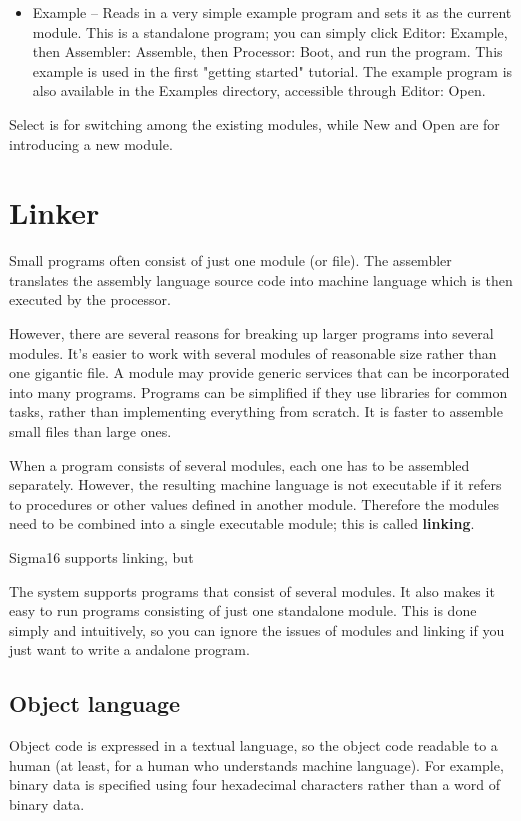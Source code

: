 \documentclass[11pt]{article}
\begin{document}
\begin{itemize}
\item Example -- Reads in a very simple example program and sets it as the
current module.  This is a standalone program; you can simply click
Editor: Example, then Assembler: Assemble, then Processor: Boot, and
run the program.  This example is used in the first "getting
started" tutorial.  The example program is also available in the
Examples directory, accessible through Editor: Open.
\end{itemize}

Select is for switching among the existing modules, while New and Open
are for introducing a new module.

\section*{Linker}
\label{sec:org6200deb}
Small programs often consist of just one module (or file).  The
assembler translates the assembly language source code into machine
language which is then executed by the processor.

However, there are several reasons for breaking up larger programs
into several modules.  It's easier to work with several modules of
reasonable size rather than one gigantic file.  A module may provide
generic services that can be incorporated into many programs.
Programs can be simplified if they use libraries for common tasks,
rather than implementing everything from scratch.  It is faster to
assemble small files than large ones.

When a program consists of several modules, each one has to be
assembled separately.  However, the resulting machine language is not
executable if it refers to procedures or other values defined in
another module.  Therefore the modules need to be combined into a
single executable module; this is called \textbf{linking}.

Sigma16 supports linking, but

The system supports programs that consist of several modules.  It also
makes it easy to run programs consisting of just one standalone
module.  This is done simply and intuitively, so you can ignore the
issues of modules and linking if you just want to write a andalone
program.

\subsection*{Object language}
\label{sec:org9add70b}

Object code is expressed in a textual language, so the object code
readable to a human (at least, for a human who understands machine
language).  For example, binary data is specified using four
hexadecimal characters rather than a word of binary data.
\end{document}
